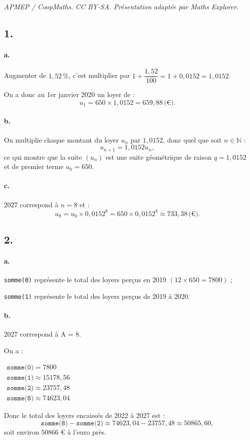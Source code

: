 \documentclass[10pt]{article}
\begin{document}
\noindent\textit{APMEP / CoopMaths. CC BY-SA. Présentation adaptée par Maths Explorer.}\par\medskip
\subsection*{1.}

\paragraph{a.} Augmenter de \(1{,}52 \, \%\), c'est multiplier par \(1 + \dfrac{1,52}{100} = 1 + 0{,}0152 = 1{,}0152\).

On a donc au 1er janvier 2020 un loyer de :
\[
u_1 = 650 \times 1{,}0152 = 659{,}88 \, \text{(€)}.
\]

\paragraph{b.} On multiplie chaque montant du loyer \( u_n \) par \( 1{,}0152 \), donc quel que soit \( n \in \mathbb{N} \) :
\[
u_{n+1} = 1{,}0152 u_n,
\]
ce qui montre que la suite \( (u_n) \) est une suite géométrique de raison \( q = 1{,}0152 \) et de premier terme \( u_0 = 650 \).

\paragraph{c.} 2027 correspond à \( n = 8 \) et :
\[
u_8 = u_0 \times 0{,}0152^8 = 650 \times 0{,}0152^8 \approx 733{,}38 \, \text{(€)}.
\]

\subsection*{2.}

\paragraph{a.} \texttt{somme(0)} représente le total des loyers perçus en 2019 \( (12 \times 650 = 7800) \) ;

\texttt{somme(1)} représente le total des loyers perçus de 2019 à 2020.

\paragraph{b.} 2027 correspond à A = 8.

On a :

\(\begin{gathered}\texttt{somme(0)} = 7 800 \\
\texttt{somme(1)} \approx 15 178{,}56 \\
\texttt{somme(2)} \approx 23 757{,}48 \\
\texttt{somme(8)} \approx 74 623{,}04\end{gathered}\)

Donc le total des loyers encaissés de 2022 à 2027 est :
\[
\texttt{somme(8)} - \texttt{somme(2)} \approx 74623{,}04 - 23757{,}48 \approx 50865{,}60,
\]
soit environ \(50866\) € à l'euro près.
\end{document}
